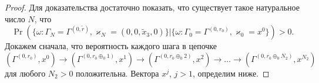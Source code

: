\begin{proof}
Для доказательства достаточно показать,  что существует такое натуральное число $N$,  что 
\begin{equation*}
\Pr(\{\omega\colon\Gamma_{N}=\Gamma^{(0, \tilde{r} )},  \varkappa_{N}=(0,  0,  \tilde{x}_3,  0)\}|
\{\omega\colon\Gamma_{0}=\Gamma^{(0,  r_0)},  \varkappa_{0} = x^0\})>0.
\end{equation*}
Докажем сначала,  что вероятность каждого шага в цепочке
\begin{equation*}
(\Gamma^{(0, r_0)}, x^0) \rightarrow (\Gamma^{(0, r_0\oplus_{0}1)}, x^1) \rightarrow (\Gamma^{(0, r_0\oplus_{0}2)},  x^2) \rightarrow \ldots \rightarrow (\Gamma^{(0,  r_0\oplus_{0} N_2)},  x^{N_2})
\end{equation*}
для любого $N_2 > 0$ положительна. Вектора $x^j$,  $j>1$,  определим ниже.


\end{proof}
